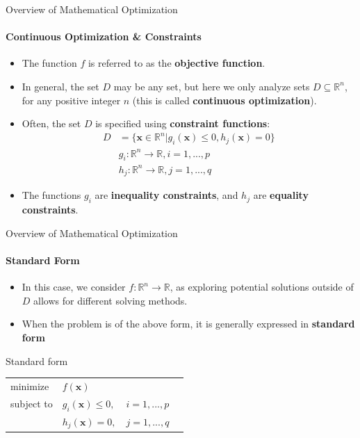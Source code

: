 \documentclass{beamer}
\renewcommand{\vec}{\mathbf}
\begin{document}
	\begin{frame}{Overview of Mathematical Optimization}
		\framesubtitle{Continuous Optimization \& Constraints}
		\begin{itemize}
			\item The function $f$ is referred to as the \textbf{objective function}.
			\item In general, the set $D$ may be any set, but here we only analyze sets $D\subseteq\mathbb{R}^n$, for any positive integer $n$ (this is called \textbf{continuous optimization}).
			\item Often, the set $D$ is specified using \textbf{constraint functions}:
			\begin{align*}
				D &= \{\vec{x}\in\mathbb{R}^n | g_i(\vec{x}) \leq 0, h_j(\vec{x}) = 0\}\\
				&g_i:\mathbb{R}^n\to\mathbb{R}, i=1,...,p\\
				&h_j:\mathbb{R}^n\to\mathbb{R}, j = 1,...,q
			\end{align*}
			\item The functions $g_i$ are \textbf{inequality constraints}, and $h_j$ are \textbf{equality constraints}.
		\end{itemize}
	\end{frame}

	\begin{frame}{Overview of Mathematical Optimization}
		\framesubtitle{Standard Form}
		\begin{itemize}
			\item In this case, we consider $f: \mathbb{R}^n\to\mathbb{R}$, as exploring potential solutions outside of $D$ allows for different solving methods.
			\item When the problem is of the above form, it is generally expressed in \textbf{standard form}
		\end{itemize}
		\begin{block}{Standard form}
			\begin{tabularx}{\textwidth}{l l l X}
				minimize	& $f(\vec{x})$				&				& \\
				subject to	& $g_i(\vec{x})\leq 0,$	& $i=1,...,p$	& \\
				& $h_j(\vec{x}) = 0,$		& $j=1,...,q$	&
			\end{tabularx}
		\end{block}
	\end{frame}
\end{document}
